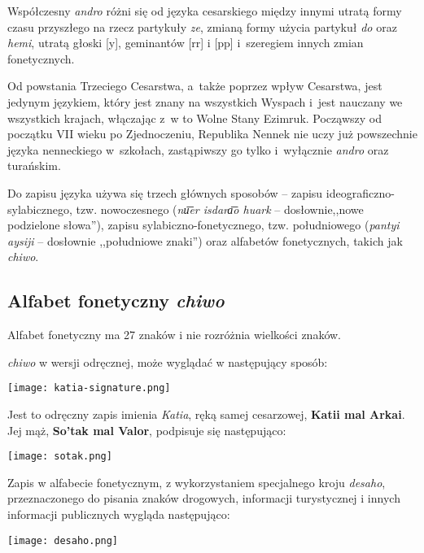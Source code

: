 Współczesny \emph{andro} różni się od języka cesarskiego między innymi utratą
formy czasu przyszłego na rzecz partykuły \emph{ze}, zmianą formy użycia
partykuł \emph{do} oraz \emph{hemi}, utratą głoski [y], geminantów [rr] i [pp]
i~szeregiem innych zmian fonetycznych.

Od powstania Trzeciego Cesarstwa, a~także poprzez wpływ Cesarstwa, jest jedynym
językiem, który jest znany na wszystkich Wyspach i~jest nauczany we wszystkich
krajach, włączając z~w to Wolne Stany Ezimruk. Począwszy od początku VII wieku
po Zjednoczeniu, Republika Nennek nie uczy już powszechnie języka nenneckiego
w~szkołach, zastąpiwszy go tylko i~wyłącznie \emph{andro} oraz turańskim.

Do zapisu języka używa się trzech głównych sposobów -- zapisu
ideograficzno-sylabicznego, tzw. nowoczesnego (\emph{nu͞er isdara͞o huark} --
dosłownie,,nowe podzielone słowa''), zapisu sylabiczno-fonetycznego, tzw.
południowego (\emph{pantyi aysiji} -- dosłownie ,,południowe znaki'') oraz
alfabetów fonetycznych, takich jak \emph{chiwo}.

\subsection{Alfabet fonetyczny \emph{chiwo}}

Alfabet fonetyczny ma 27 znaków i nie rozróżnia wielkości znaków.

\emph{chiwo} w wersji odręcznej, może wyglądać w następujący sposób:

\begin{center}
    \texttt{[image: katia-signature.png]}    
\end{center}

Jest to odręczny zapis imienia \emph{Katia}, ręką samej cesarzowej,
\textbf{Katii mal Arkai}. Jej mąż, \textbf{So'tak mal Valor}, podpisuje się 
następująco:

\begin{center}
    \texttt{[image: sotak.png]}
\end{center}

Zapis w alfabecie fonetycznym, z wykorzystaniem specjalnego kroju \emph{desaho},
przeznaczonego do pisania znaków drogowych, informacji turystycznej i innych
informacji publicznych wygląda następująco:

\begin{center}
    \texttt{[image: desaho.png]}
\end{center}

